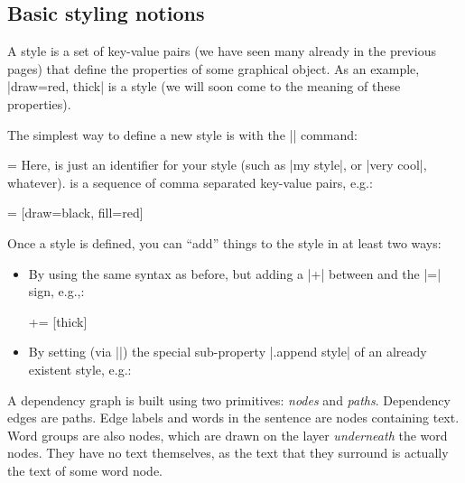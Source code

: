 \documentclass[a4paper]{ltxdoc}
\newcommand{\options}[1][key-value-pairs]{\opt{\oarg{#1}}}
\begin{document}
\subsection{Basic styling notions}

A style is a set of key-value pairs (we have seen many already in the previous pages) that define the properties of some graphical object. As an example, |{draw=red, thick}| is a style (we will soon come to the meaning of these properties).

The simplest way to define a new style is with the |\tikzstyle| command:

\begin{command}{\tikzstyle{}=\options}
   Here,  is just an identifier for your style (such as |my style|, or |very cool|, whatever). \options{} is a sequence of comma separated key-value pairs, e.g.:
\begin{codeexample}
    = [draw=black, fill=red]
\end{codeexample}
Once a style is defined, you can ``add'' things to the style in at least two ways:
\begin{itemize}
   \item By using the same syntax as before, but adding a |+| between  and the |=| sign, e.g.,:
\begin{codeexample}
    += [thick]
\end{codeexample}
   \item By setting (via |\tikzset|) the special sub-property |.append style| of an already existent style, e.g.:
\begin{codeexample}
\end{codeexample}
\end{itemize}
\end{command}

A dependency graph is built using two \tikzname{} primitives: \emph{nodes} and \emph{paths}. Dependency edges are paths. Edge labels and words in the sentence are nodes containing text. Word groups are also nodes, which are drawn on the layer \emph{underneath} the word nodes. They have no text themselves, as the text that they surround is actually the text of some word node.
\end{document}
